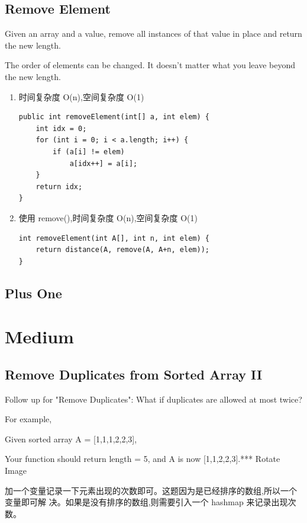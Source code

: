 \documentclass[12pt]{book}
\begin{document}
\subsection{Remove Element}
\label{sec-1-1-2}
Given an array and a value, remove all instances of that value in place and return the new length.

The order of elements can be changed. It doesn't matter what you leave
beyond the new length.

\begin{enumerate}
\item 时间复杂度 O(n),空间复杂度 O(1)
\label{sec-1-1-2-1}
\lstset{language=java,label= ,caption= ,numbers=none}
\begin{lstlisting}
public int removeElement(int[] a, int elem) {
    int idx = 0;
    for (int i = 0; i < a.length; i++) {
        if (a[i] != elem)
            a[idx++] = a[i];
    }
    return idx;
}
\end{lstlisting}
\item 使用 remove(),时间复杂度 O(n),空间复杂度 O(1)
\label{sec-1-1-2-2}
\lstset{language=java,label= ,caption= ,numbers=none}
\begin{lstlisting}
int removeElement(int A[], int n, int elem) {
    return distance(A, remove(A, A+n, elem));
}
\end{lstlisting}
\end{enumerate}

\subsection{Plus One}
\label{sec-1-1-3}

\section{Medium}
\label{sec-1-2}
\subsection{Remove Duplicates from Sorted Array II}
\label{sec-1-2-1}
Follow up for "Remove Duplicates":
What if duplicates are allowed at most twice?

For example,

Given sorted array A = [1,1,1,2,2,3],

Your function should return length = 5, and A is now [1,1,2,2,3].*** Rotate Image

加一个变量记录一下元素出现的次数即可。这题因为是已经排序的数组,所以一个变量即可解
决。如果是没有排序的数组,则需要引入一个 hashmap 来记录出现次数。
\end{document}
